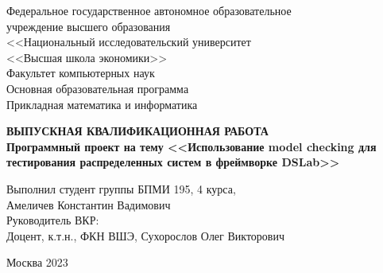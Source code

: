 \begin{titlepage}
    \newpage
    
    {
    \begin{center}
    Федеральное государственное автономное образовательное \\
    учреждение высшего образования \\
    \vspace{1em}
    <<Национальный исследовательский университет \\
    <<Высшая школа экономики>>
    \\
    \vspace{4em}
    Факультет компьютерных наук \\
    \vspace{1em}
    Основная образовательная программа \\
    Прикладная математика и информатика \\
    \end{center}
    }
    
    \vspace{10em}
    
    \begin{center}
        \textbf{ВЫПУСКНАЯ КВАЛИФИКАЦИОННАЯ РАБОТА}
        \vspace{2em}
        \\
        \textbf{
            Программный проект на тему
            \linebreak
            <<Использование model checking для тестирования распределенных систем в фреймворке DSLab>>
        }
    \end{center}
    
    \vspace{8em}
    
    {
    \hfill\parbox{16cm}{
    \hspace*{5cm}\hspace*{-5cm}Выполнил студент группы БПМИ 195, 4 курса,\\
    Амеличев Константин Вадимович\\
     
    \hspace*{5cm}\hspace*{-5cm}Руководитель ВКР:\\
    Доцент, к.т.н., ФКН ВШЭ, Сухорослов Олег Викторович\\
    
    }
    }
    
    \vspace{\fill}

\begin{center}
Москва 2023
\end{center}
    
\end{titlepage}